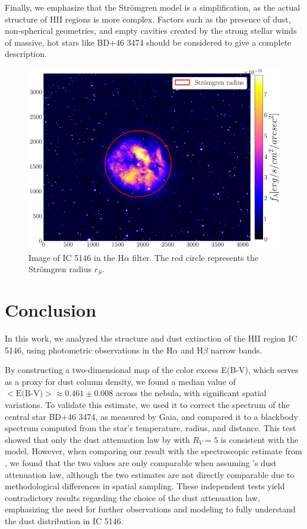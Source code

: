 \documentclass[fleqn,usenatbib]{mnras}
\begin{document}
Finally, we emphasize that the Strömgren model is a simplification, as the actual structure of HII regions is more complex.
Factors such as the presence of dust, non-spherical geometries, and empty cavities created by the strong stellar winds of massive, hot stars like BD+46 3474 should be considered to give a complete description.


\begin{figure}\centering
	\includegraphics[width=0.98\columnwidth]{Stromgren.png}
    \caption{Image of IC 5146 in the H$\alpha$ filter. The red circle represents the Strömgren radius $r_S$.}
    \label{fig:Stromgren}
\end{figure}



\section{Conclusion}\label{sec:conclusion}
In this work, we analyzed the structure and dust extinction of the HII region IC 5146, using photometric observations in the H$\alpha$ and H$\beta$ narrow bands.

By constructing a two-dimensional map of the color excess E(B-V), which serves as a proxy for dust column density, we found a median value of $<\text{E(B-V)}> \approx 0.461 \pm 0.008$ across the nebula, with significant spatial variations.
To validate this estimate, we used it to correct the spectrum of the central star BD+46 3474, as measured by Gaia, and compared it to a blackbody spectrum computed from the star's temperature, radius, and distance.
This test showed that only the dust attenuation law by \cite{Cardelli_1989} with $R_V = 5$ is consistent with the model.
However, when comparing our result with the spectroscopic estimate from \cite{Garcia-Rojas_2014}, we found that the two values are only comparable when assuming \cite{Calzetti_2000}'s dust attenuation law, although the two estimates are not directly comparable due to methodological differences in spatial sampling.
These independent tests yield contradictory results regarding the choice of the dust attenuation law, emphasizing the need for further observations and modeling to fully understand the dust distribution in IC 5146.
\end{document}
